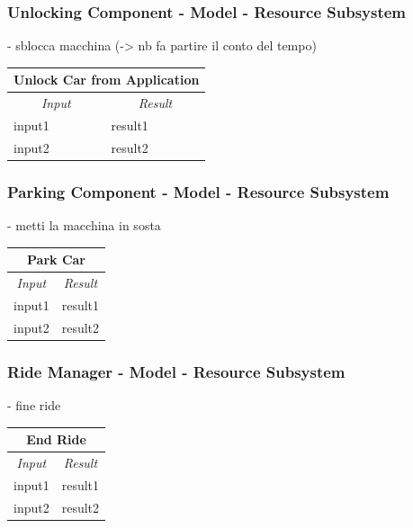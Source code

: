 \documentclass[english]{article}
\begin{document}
\subsubsection{Unlocking Component - Model - Resource Subsystem}
- sblocca macchina (-> nb fa partire il conto del tempo)

\begin{center}
	\begin{tabular}{ | m{6cm} | m{6cm} | }
		\hline
		\multicolumn{2}{|c|}{\textbf{Unlock Car from Application}} \\
		\hline
		\multicolumn{1}{|c|}{\textit{Input}} & \multicolumn{1}{c|}{\textit{Result}} \\
		\hline
		input1 & result1 \\
		\hline
		input2 & result2 \\
		\hline
	\end{tabular}
\end{center}

\subsubsection{Parking Component - Model - Resource Subsystem}
- metti la macchina in sosta

\begin{center}
	\begin{tabular}{ | m{6cm} | m{6cm} | }
		\hline
		\multicolumn{2}{|c|}{\textbf{Park Car}} \\
		\hline
		\multicolumn{1}{|c|}{\textit{Input}} & \multicolumn{1}{c|}{\textit{Result}} \\
		\hline
		input1 & result1 \\
		\hline
		input2 & result2 \\
		\hline
	\end{tabular}
\end{center}

\subsubsection{Ride Manager - Model - Resource Subsystem}
- fine ride

\begin{center}
	\begin{tabular}{ | m{6cm} | m{6cm} | }
		\hline
		\multicolumn{2}{|c|}{\textbf{End Ride}} \\
		\hline
		\multicolumn{1}{|c|}{\textit{Input}} & \multicolumn{1}{c|}{\textit{Result}} \\
		\hline
		input1 & result1 \\
		\hline
		input2 & result2 \\
		\hline
	\end{tabular}
\end{center}
\end{document}
